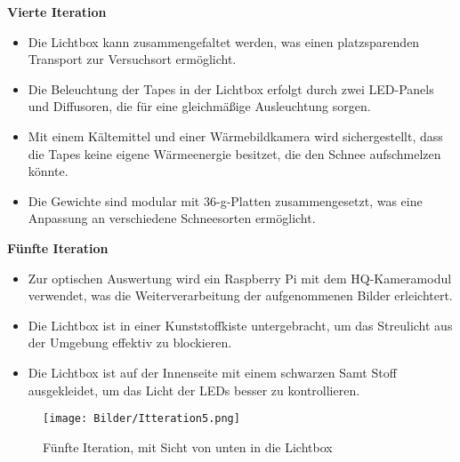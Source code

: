 \textbf{Vierte Iteration}

\begin{itemize}
    \item Die Lichtbox kann zusammengefaltet werden, was einen platzsparenden Transport zur Versuchsort ermöglicht.
    \item Die Beleuchtung der Tapes in der Lichtbox erfolgt durch zwei LED-Panels und Diffusoren, die für eine gleichmäßige Ausleuchtung sorgen.
    \item Mit einem Kältemittel und einer Wärmebildkamera wird sichergestellt, dass die Tapes keine eigene Wärmeenergie besitzet, die den Schnee aufschmelzen könnte.
    \item Die Gewichte sind modular mit 36-g-Platten zusammengesetzt, was eine Anpassung an verschiedene Schneesorten ermöglicht.
\end{itemize}

\textbf{Fünfte Iteration}
\label{sec:funfItt}
\begin{itemize}
    \item Zur optischen Auswertung wird ein Raspberry Pi mit dem HQ-Kameramodul verwendet, was die Weiterverarbeitung der aufgenommenen Bilder erleichtert.
    \item Die Lichtbox ist in einer Kunststoffkiste untergebracht, um das Streulicht aus der Umgebung effektiv zu blockieren.
      \item Die Lichtbox ist auf der Innenseite mit einem schwarzen Samt Stoff ausgekleidet, um das Licht der LEDs besser zu kontrollieren.
\end{itemize}


\begin{figure}
    \centering
    \texttt{[image: Bilder/Itteration5.png]}
    \caption{Fünfte Iteration, mit Sicht von unten in die Lichtbox}
    \label{fig:funfItter}
\end{figure}
